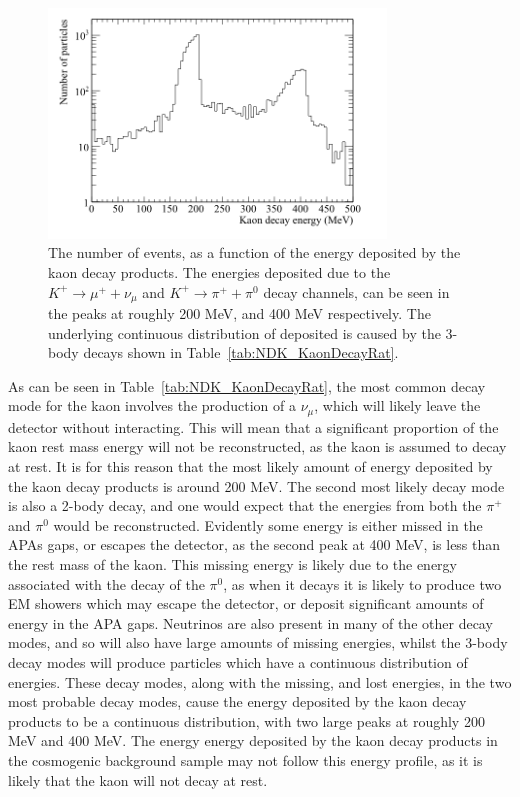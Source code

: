 \begin{figure}[h!]
  \centering
  \includegraphics[width=0.8\textwidth]{NucleonDecay_KaonDecayEnergy}
  \caption[The number of events, as a function of the energy deposited by the kaon decay products.]
          {The number of events, as a function of the energy deposited by the kaon decay products. The energies deposited due to the $K^{+} \rightarrow \mu^{+} + \nu_{\mu}$ and $K^{+} \rightarrow \pi^{+} + \pi^{0}$ decay channels, can be seen in the peaks at roughly 200 MeV, and 400 MeV respectively. The underlying continuous distribution of deposited is caused by the 3-body decays shown in Table~\ref{tab:NDK_KaonDecayRat}.}
  \label{fig:NDK_KaonDecayEn}
\end{figure}

As can be seen in Table~\ref{tab:NDK_KaonDecayRat}, the most common decay mode for the kaon involves the production of a $\nu_{\mu}$, which will likely leave the detector without interacting. This will mean that a significant proportion of the kaon rest mass energy will not be reconstructed, as the kaon is assumed to decay at rest. It is for this reason that the most likely amount of energy deposited by the kaon decay products is around 200 MeV. The second most likely decay mode is also a 2-body decay, and one would expect that the energies from both the $\pi^{+}$ and $\pi^{0}$ would be reconstructed. Evidently some energy is either missed in the APAs gaps, or escapes the detector, as the second peak at 400 MeV, is less than the rest mass of the kaon. This missing energy is likely due to the energy associated with the decay of the $\pi^0$, as when it decays it is likely to produce two EM showers which may escape the detector, or deposit significant amounts of energy in the APA gaps. Neutrinos are also present in many of the other decay modes, and so will also have large amounts of missing energies, whilst the 3-body decay modes will produce particles which have a continuous distribution of energies. These decay modes, along with the missing, and lost energies, in the two most probable decay modes, cause the energy deposited by the kaon decay products to be a continuous distribution, with two large peaks at roughly 200 MeV and 400 MeV. The energy energy deposited by the kaon decay products in the cosmogenic background sample may not follow this energy profile, as it is likely that the kaon will not decay at rest. \\

